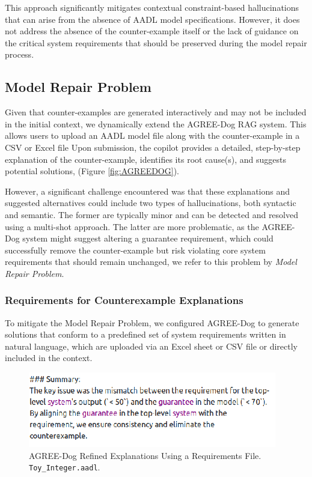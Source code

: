 This approach significantly mitigates contextual constraint-based hallucinations that can arise from the absence of AADL model specifications. However, it does not address the absence of the counter-example itself or the lack of guidance on the critical system requirements that should be preserved during the model repair process.
 

\subsection{Model Repair Problem}

Given that counter-examples are generated interactively and may not be included in the initial context, we dynamically extend the AGREE-Dog RAG system. This allows users to upload an AADL model file along with the counter-example in a CSV or Excel file %
Upon submission, the copilot provides a detailed, step-by-step explanation of the counter-example, identifies its root cause(s), and suggests potential solutions, (Figure \ref{fig:AGREEDOG}). 


However, a significant challenge encountered was that these explanations and suggested alternatives could include two types of hallucinations, both syntactic and semantic. The former are typically minor and can be detected and resolved using a multi-shot approach. The latter are more problematic, as the AGREE-Dog system might suggest altering a guarantee requirement, which could successfully remove the counter-example but risk violating core system requirements that should remain unchanged, we refer to this problem by \textit{Model Repair Problem}. 


\subsubsection{Requirements for Counterexample Explanations}

To mitigate the Model Repair Problem, we configured AGREE-Dog to generate solutions that conform to a predefined set of system requirements written in natural language, which are uploaded via an Excel sheet or CSV file or directly included in the context. 

\begin{figure}[t]  
    \centering
    \includegraphics[width=0.95\columnwidth]{REQ-AWARE-REF.png}  %
    \caption{AGREE-Dog Refined Explanations Using a Requirements File. \texttt{Toy\_Integer.aadl}.}
    \label{fig:REQ-AWARE-EXPL}
\end{figure}


